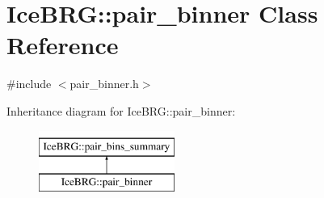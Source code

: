 \hypertarget{classIceBRG_1_1pair__binner}{}\section{Ice\+B\+R\+G\+:\+:pair\+\_\+binner Class Reference}
\label{classIceBRG_1_1pair__binner}


{\ttfamily \#include $<$pair\+\_\+binner.\+h$>$}

Inheritance diagram for Ice\+B\+R\+G\+:\+:pair\+\_\+binner\+:\begin{figure}[H]
\begin{center}
\leavevmode
\includegraphics[height=2.000000cm]{classIceBRG_1_1pair__binner}
\end{center}
\end{figure}
